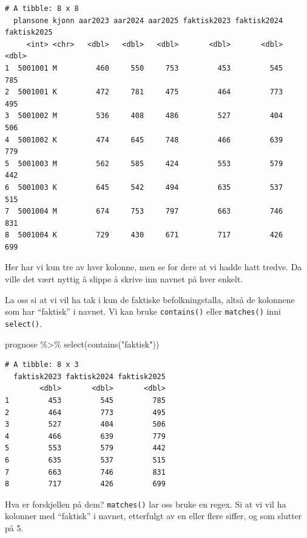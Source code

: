 \documentclass[
  letterpaper,
  DIV=11,
  numbers=noendperiod]{scrreprt}
\newenvironment{Shaded}{\begin{snugshade}}{\end{snugshade}}
\newcommand{\FunctionTok}[1]{\textcolor[rgb]{0.28,0.35,0.67}{#1}}
\newcommand{\NormalTok}[1]{\textcolor[rgb]{0.00,0.23,0.31}{#1}}
\newcommand{\SpecialCharTok}[1]{\textcolor[rgb]{0.37,0.37,0.37}{#1}}
\newcommand{\StringTok}[1]{\textcolor[rgb]{0.13,0.47,0.30}{#1}}
\begin{document}
\begin{verbatim}
# A tibble: 8 x 8
  plansone kjonn aar2023 aar2024 aar2025 faktisk2023 faktisk2024 faktisk2025
     <int> <chr>   <dbl>   <dbl>   <dbl>       <dbl>       <dbl>       <dbl>
1  5001001 M         460     550     753         453         545         785
2  5001001 K         472     781     475         464         773         495
3  5001002 M         536     408     486         527         404         506
4  5001002 K         474     645     748         466         639         779
5  5001003 M         562     585     424         553         579         442
6  5001003 K         645     542     494         635         537         515
7  5001004 M         674     753     797         663         746         831
8  5001004 K         729     430     671         717         426         699
\end{verbatim}

Her har vi kun tre av hver kolonne, men se for dere at vi hadde hatt
tredve. Da ville det vært nyttig å slippe å skrive inn navnet på hver
enkelt.

La oss si at vi vil ha tak i kun de faktiske befolkningstalla, altså de
kolonnene som har ``faktisk'' i navnet. Vi kan bruke \texttt{contains()}
eller \texttt{matches()} inni \texttt{select()}.

\begin{Shaded}
\begin{Highlighting}[]
\NormalTok{prognose }\SpecialCharTok{\%\textgreater{}\%} 
  \FunctionTok{select}\NormalTok{(}\FunctionTok{contains}\NormalTok{(}\StringTok{"faktisk"}\NormalTok{))}
\end{Highlighting}
\end{Shaded}

\begin{verbatim}
# A tibble: 8 x 3
  faktisk2023 faktisk2024 faktisk2025
        <dbl>       <dbl>       <dbl>
1         453         545         785
2         464         773         495
3         527         404         506
4         466         639         779
5         553         579         442
6         635         537         515
7         663         746         831
8         717         426         699
\end{verbatim}

Hva er forskjellen på dem? \texttt{matches()} lar oss bruke en regex. Si
at vi vil ha kolonner med ``faktisk'' i navnet, etterfulgt av en eller
flere siffer, og som slutter på 5.

\begin{Shaded}
\end{Shaded}
\end{document}
